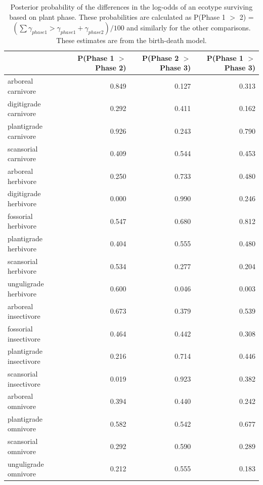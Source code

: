 \documentclass[12pt,letterpaper]{article}
\begin{document}
\begin{table}[ht]
  \centering
  \caption[Posterior probablity estimates of differences in survival by plant phase]{Posterior probability of the differences in the log-odds of an ecotype surviving based on plant phase. These probabilities are calculated as P(Phase 1 \(>\) 2) = \( (\sum \gamma_{phase 1} > \gamma_{phase 1} + \gamma_{phase 2}) / 100\) and similarly for the other comparisons. These estimates are from the birth-death model.}
  \label{tab:surv_plant}
  \begin{tabular}{ l r r r }
    \hline
    & P(Phase 1 $>$ Phase 2) & P(Phase 2 $>$ Phase 3) & P(Phase 1 $>$ Phase 3) \\ 
    \hline
    arboreal carnivore & 0.849 & 0.127 & 0.313 \\ 
    digitigrade carnivore & 0.292 & 0.411 & 0.162 \\ 
    plantigrade carnivore & 0.926 & 0.243 & 0.790 \\ 
    scansorial carnivore & 0.409 & 0.544 & 0.453 \\ 
    arboreal herbivore & 0.250 & 0.733 & 0.480 \\ 
    digitigrade herbivore & 0.000 & 0.990 & 0.246 \\ 
    fossorial herbivore & 0.547 & 0.680 & 0.812 \\ 
    plantigrade herbivore & 0.404 & 0.555 & 0.480 \\ 
    scansorial herbivore & 0.534 & 0.277 & 0.204 \\ 
    unguligrade herbivore & 0.600 & 0.046 & 0.003 \\ 
    arboreal insectivore & 0.673 & 0.379 & 0.539 \\ 
    fossorial insectivore & 0.464 & 0.442 & 0.308 \\ 
    plantigrade insectivore & 0.216 & 0.714 & 0.446 \\ 
    scansorial insectivore & 0.019 & 0.923 & 0.382 \\ 
    arboreal omnivore & 0.394 & 0.440 & 0.242 \\ 
    plantigrade omnivore & 0.582 & 0.542 & 0.677 \\ 
    scansorial omnivore & 0.292 & 0.590 & 0.289 \\ 
    unguligrade omnivore & 0.212 & 0.555 & 0.183 \\ 
    \hline
  \end{tabular}
\end{table}
\end{document}
